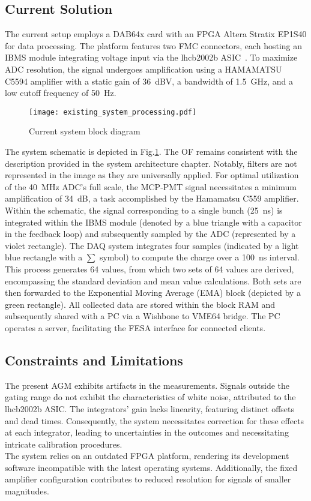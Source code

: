 \subsection{Current Solution}
The current setup employs a DAB64x card with an FPGA Altera Stratix EP1S40 for
data processing. The platform features two FMC connectors, each hosting an IBMS
module integrating voltage input via the lhcb2002b ASIC~\cite{lhcb_asic}. To
maximize ADC resolution, the signal undergoes amplification using a HAMAMATSU
C5594 amplifier with a static gain of \SI{36}{dBV}, a bandwidth of
\SI{1.5}{GHz}, and a low cutoff frequency of \SI{50}{Hz}.
\begin{figure}[!tbh]
    \centering
    \texttt{[image: existing\_system\_processing.pdf]}
    \caption{Current system block diagram}
    \label{fig:current_system_processing}
\end{figure}
The system schematic is depicted in Fig.\ref{fig:current_system_processing}.
The OF remains consistent with the description provided
in the system architecture chapter. Notably, filters are not represented in the
image as they are universally applied. For optimal utilization of the \SI{40}{MHz}
ADC's full scale, the MCP-PMT signal necessitates a minimum amplification of
\SI{34}{dB}, a task accomplished by the Hamamatsu C559
amplifier\cite{bsra_first_operation}.\\
Within the schematic, the signal corresponding to a single bunch (\SI{25}{ns})
is integrated within the IBMS module (denoted by a blue triangle with a
capacitor in the feedback loop) and subsequently sampled by the ADC
(represented by a violet rectangle). The DAQ system integrates four samples
(indicated by a light blue rectangle with a $\sum$ symbol) to compute the
charge over a \SI{100}{ns} interval. This process generates 64 values, from
which two sets of 64 values are derived, encompassing the standard deviation
and mean value calculations. Both sets are then forwarded to the Exponential
Moving Average (EMA) block (depicted by a green rectangle). All collected data
are stored within the block RAM and subsequently shared with a PC via a
Wishbone to VME64 bridge. The PC operates a server, facilitating the FESA
interface for connected clients.

\subsection{Constraints and Limitations}
The present AGM exhibits artifacts in the measurements. Signals outside the
gating range do not exhibit the characteristics of white noise, attributed to
the lhcb2002b ASIC. The integrators' gain lacks linearity, featuring distinct
offsets and dead times. Consequently, the system necessitates correction for
these effects at each integrator, leading to uncertainties in the outcomes and
necessitating intricate calibration procedures.\\
The system relies on an outdated FPGA platform, rendering its development
software incompatible with the latest operating systems. Additionally, the
fixed amplifier configuration contributes to reduced resolution for signals of
smaller magnitudes.

